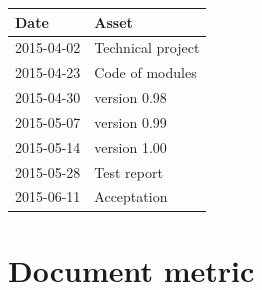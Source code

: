 \documentclass{article}
\begin{document}
\begin{center}

	\begin{tabular}{| l | p{7cm} |}

		\hline
		\cellcolor[HTML]{C0C0C0}Date & \cellcolor[HTML]{C0C0C0} Asset \\
		
		\hline
	  	2015-04-02 & Technical project \\
		
		\hline
	  	2015-04-23 & Code of modules\\
	
		\hline
		2015-04-30 & version 0.98\\

		\hline
		2015-05-07 & version 0.99\\	
		
		\hline
		2015-05-14 & version 1.00\\
		
		\hline
		2015-05-28 & Test report\\
		
		\hline
		2015-06-11 & Acceptation \\
		
		\hline
	
	\end{tabular}

\end{center}

\section*{Document metric}
\end{document}
